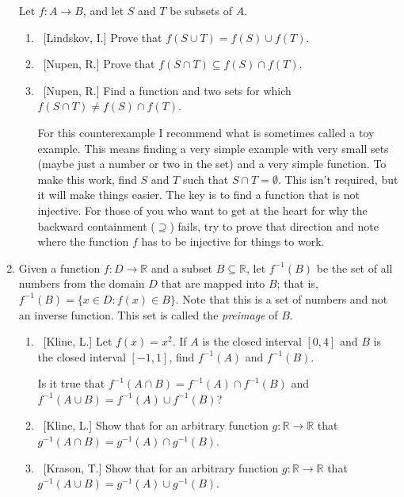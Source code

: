 \documentclass[10pt]{article}
\begin{document}
\begin{enumerate}
Let $f:A \to B$, and let $S$ and $T$ be subsets of $A$.

	\begin{enumerate}
	
	\item  ~[Lindskov, I.] Prove that $f(S \cup T) = f(S) \cup f(T)$.
	
	\item  ~[Nupen, R.] Prove that $f(S \cap T) \subseteq f(S) \cap f(T)$.
	
	\item  ~[Nupen, R.] Find a function and two sets for which $f(S \cap T) \neq f(S) \cap f(T)$.
	
	For this counterexample I recommend what is sometimes called a toy example.  This means finding a very simple example with very small sets (maybe just a number or two in the set) and a very simple function.  To make this work, find $S$ and $T$ such that $S \cap T = \emptyset$.  This isn't required, but it will make things easier.  The key is to find a function that is not injective.  For those of you who want to get at the heart for why the backward containment ($\supseteq$) fails, try to prove that direction and note where the function $f$ has to be injective for things to work.
	
	\end{enumerate}
	
\item  Given a function $f: D \to \mathbb{R}$ and a subset $B \subseteq \mathbb{R}$, let $f^{-1}(B)$ be the set of all numbers from the domain $D$ that are mapped into $B$; that is, $f^{-1}(B) = \{ x \in D: f(x) \in B \}$.  Note that this is a set of numbers and not an inverse function.  This set is called the \emph{preimage} of $B$.

	\begin{enumerate}
	
	\item  ~[Kline, L.] Let $f(x) = x^2$.  If $A$ is the closed interval $[0,4]$ and $B$ is the closed interval $[-1,1]$, find $f^{-1}(A)$ and $f^{-1}(B)$.
	
	Is it true that $f^{-1}(A \cap B) = f^{-1}(A) \cap f^{-1}(B)$ and $f^{-1}(A \cup B) = f^{-1}(A) \cup f^{-1}(B)$?
	
	\item  ~[Kline, L.] Show that for an arbitrary function $g: \mathbb{R} \to \mathbb{R}$ that $g^{-1}(A \cap B) = g^{-1}(A) \cap g^{-1}(B)$.
	
	\item  ~[Krason, T.] Show that for an arbitrary function $g: \mathbb{R} \to \mathbb{R}$ that $g^{-1}(A \cup B) = g^{-1}(A) \cup g^{-1}(B)$.
	

\end{enumerate}
\end{enumerate}
\end{document}
